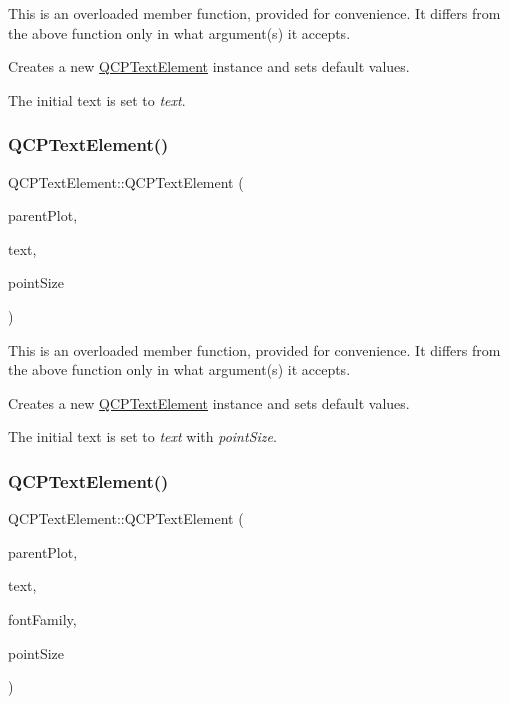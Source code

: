 This is an overloaded member function, provided for convenience. It differs from the above function only in what argument(s) it accepts.

Creates a new \mbox{\hyperlink{class_q_c_p_text_element}{Q\+C\+P\+Text\+Element}} instance and sets default values.

The initial text is set to {\itshape text}. \mbox{\label{class_q_c_p_text_element_a2684e65def4a5daf80be9f5f149ca9b2}} 
\subsubsection{\texorpdfstring{QCPTextElement()}{QCPTextElement()}\hspace{0.1cm}{\footnotesize\ttfamily [3/5]}}
{\footnotesize\ttfamily Q\+C\+P\+Text\+Element\+::\+Q\+C\+P\+Text\+Element (\begin{DoxyParamCaption}\item[{\mbox{\hyperlink{class_q_custom_plot}{Q\+Custom\+Plot}} $\ast$}]{parent\+Plot,  }\item[{const Q\+String \&}]{text,  }\item[{double}]{point\+Size }\end{DoxyParamCaption})}

This is an overloaded member function, provided for convenience. It differs from the above function only in what argument(s) it accepts.

Creates a new \mbox{\hyperlink{class_q_c_p_text_element}{Q\+C\+P\+Text\+Element}} instance and sets default values.

The initial text is set to {\itshape text} with {\itshape point\+Size}. \mbox{\label{class_q_c_p_text_element_adb4bcd3743dbfabfedee4fe9c2ee93da}} 
\subsubsection{\texorpdfstring{QCPTextElement()}{QCPTextElement()}\hspace{0.1cm}{\footnotesize\ttfamily [4/5]}}
{\footnotesize\ttfamily Q\+C\+P\+Text\+Element\+::\+Q\+C\+P\+Text\+Element (\begin{DoxyParamCaption}\item[{\mbox{\hyperlink{class_q_custom_plot}{Q\+Custom\+Plot}} $\ast$}]{parent\+Plot,  }\item[{const Q\+String \&}]{text,  }\item[{const Q\+String \&}]{font\+Family,  }\item[{double}]{point\+Size }\end{DoxyParamCaption})}

